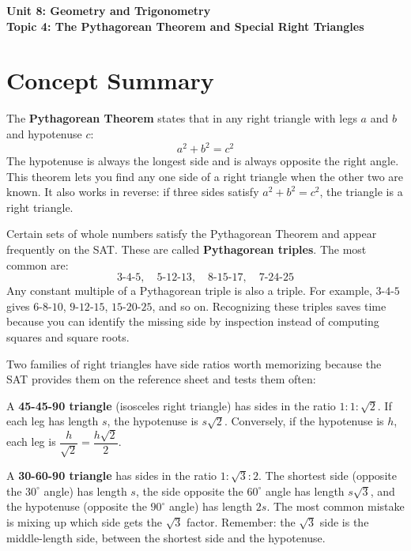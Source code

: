 \documentclass[14pt]{extarticle}
\begin{document}
\raggedright
{}

\begin{center}
    \LARGE \textbf{Unit 8: Geometry and Trigonometry} \\[6pt]
    \Large \textbf{Topic 4: The Pythagorean Theorem and Special Right Triangles}
\end{center}

\vspace{1em}

\section*{Concept Summary}

The \textbf{Pythagorean Theorem} states that in any right triangle with legs \(a\) and \(b\) and hypotenuse \(c\):
\[
a^2 + b^2 = c^2
\]
The hypotenuse is always the longest side and is always opposite the right angle. This theorem lets you find any one side of a right triangle when the other two are known. It also works in reverse: if three sides satisfy \(a^2 + b^2 = c^2\), the triangle is a right triangle.

Certain sets of whole numbers satisfy the Pythagorean Theorem and appear frequently on the SAT. These are called \textbf{Pythagorean triples}. The most common are:
\[
3\text{-}4\text{-}5, \quad 5\text{-}12\text{-}13, \quad 8\text{-}15\text{-}17, \quad 7\text{-}24\text{-}25
\]
Any constant multiple of a Pythagorean triple is also a triple. For example, \(3\text{-}4\text{-}5\) gives \(6\text{-}8\text{-}10\), \(9\text{-}12\text{-}15\), \(15\text{-}20\text{-}25\), and so on. Recognizing these triples saves time because you can identify the missing side by inspection instead of computing squares and square roots.

Two families of right triangles have side ratios worth memorizing because the SAT provides them on the reference sheet and tests them often:

A \textbf{45-45-90 triangle} (isosceles right triangle) has sides in the ratio \(1 : 1 : \sqrt{2}\). If each leg has length \(s\), the hypotenuse is \(s\sqrt{2}\). Conversely, if the hypotenuse is \(h\), each leg is \(\dfrac{h}{\sqrt{2}} = \dfrac{h\sqrt{2}}{2}\).

A \textbf{30-60-90 triangle} has sides in the ratio \(1 : \sqrt{3} : 2\). The shortest side (opposite the \(30^\circ\) angle) has length \(s\), the side opposite the \(60^\circ\) angle has length \(s\sqrt{3}\), and the hypotenuse (opposite the \(90^\circ\) angle) has length \(2s\). The most common mistake is mixing up which side gets the \(\sqrt{3}\) factor. Remember: the \(\sqrt{3}\) side is the middle-length side, between the shortest side and the hypotenuse.
\end{document}
